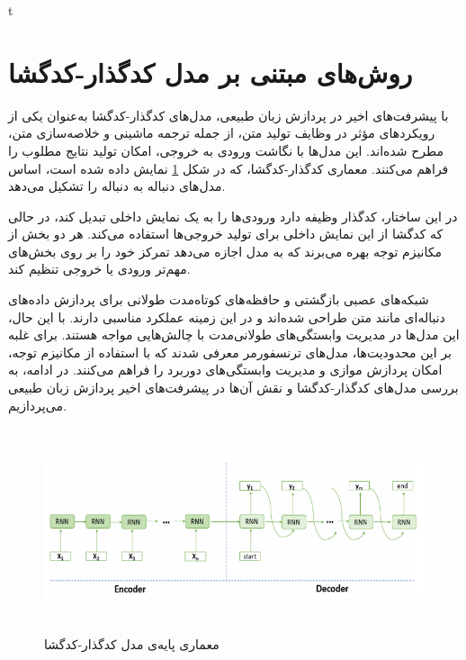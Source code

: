 t\section{روش‌های مبتنی بر مدل کدگذار-کدگشا}
با پیشرفت‌های اخیر در پردازش زبان طبیعی، مدل‌های کدگذار-کدگشا به‌عنوان یکی از رویکردهای مؤثر در وظایف تولید متن، از جمله ترجمه ماشینی و خلاصه‌سازی متن، مطرح شده‌اند. این مدل‌ها با نگاشت ورودی به خروجی، امکان تولید نتایج مطلوب را فراهم می‌کنند. معماری کدگذار-کدگشا، که در شکل \ref{fig:encoder_decoder} نمایش داده شده است، اساس مدل‌های دنباله به دنباله را تشکیل می‌دهد.

در این ساختار، کدگذار وظیفه دارد ورودی‌ها را به یک نمایش داخلی تبدیل کند، در حالی که کدگشا از این نمایش داخلی برای تولید خروجی‌ها استفاده می‌کند. هر دو بخش از مکانیزم توجه بهره می‌برند که به مدل اجازه می‌دهد تمرکز خود را بر روی بخش‌های مهم‌تر ورودی یا خروجی تنظیم کند. 

شبکه‌های عصبی بازگشتی  و حافظه‌های کوتاه‌مدت طولانی  برای پردازش داده‌های دنباله‌ای مانند متن طراحی شده‌اند و در این زمینه عملکرد مناسبی دارند. با این حال، این مدل‌ها در مدیریت وابستگی‌های طولانی‌مدت با چالش‌هایی مواجه هستند. برای غلبه بر این محدودیت‌ها، مدل‌های ترنسفورمر معرفی شدند که با استفاده از مکانیزم توجه، امکان پردازش موازی و مدیریت وابستگی‌های دوربرد را فراهم می‌کنند. در ادامه، به بررسی مدل‌های کدگذار-کدگشا و نقش آن‌ها در پیشرفت‌های اخیر پردازش زبان طبیعی می‌پردازیم. 
\begin{figure}[!h]
	\begin{center}
		\includegraphics[height=6cm]{encoder_decoder.png}
	\end{center}
	\caption{معماری پایه‌‌ی مدل کدگذار-کدگشا \cite{RL_survey}}
	\label{fig:encoder_decoder}
	\medskip
	\small
\end{figure}

